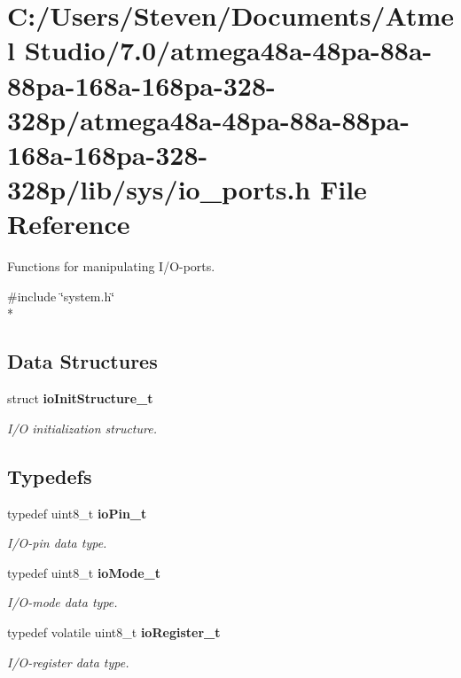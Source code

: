 \section{C\+:/\+Users/\+Steven/\+Documents/\+Atmel Studio/7.0/atmega48a-\/48pa-\/88a-\/88pa-\/168a-\/168pa-\/328-\/328p/atmega48a-\/48pa-\/88a-\/88pa-\/168a-\/168pa-\/328-\/328p/lib/sys/io\+\_\+ports.h File Reference}
\label{io__ports_8h}


Functions for manipulating I/\+O-\/ports.  


{\ttfamily \#include \char`\"{}system.\+h\char`\"{}}\\*
\subsection*{Data Structures}
\begin{DoxyCompactItemize}
\item 
struct {\bf io\+Init\+Structure\+\_\+t}
\begin{DoxyCompactList}\small\item\em I/O initialization structure. \end{DoxyCompactList}\end{DoxyCompactItemize}
\subsection*{Typedefs}
\begin{DoxyCompactItemize}
\item 
typedef uint8\+\_\+t {\bf io\+Pin\+\_\+t}\label{io__ports_8h_a9d2ac58924e4de9d78332952b7d5de5a}

\begin{DoxyCompactList}\small\item\em I/\+O-\/pin data type. \end{DoxyCompactList}\item 
typedef uint8\+\_\+t {\bf io\+Mode\+\_\+t}\label{io__ports_8h_ad7fa28ba0409fdbd18ea7743399943e7}

\begin{DoxyCompactList}\small\item\em I/\+O-\/mode data type. \end{DoxyCompactList}\item 
typedef volatile uint8\+\_\+t {\bf io\+Register\+\_\+t}\label{io__ports_8h_a5917e31f6b72d7c4dda26132d0e51501}

\begin{DoxyCompactList}\small\item\em I/\+O-\/register data type. \end{DoxyCompactList}\end{DoxyCompactItemize}
